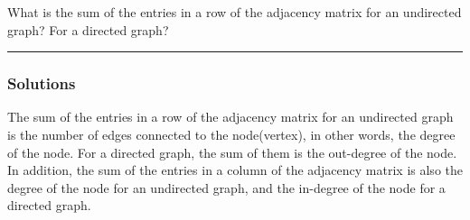 \newpage
\begin{question}
What is the sum of the entries in a row of the adjacency matrix for an undirected graph? For a directed graph?
\end{question}

\par\noindent\rule{\textwidth}{0.5pt}

\subsubsection*{Solutions}


The sum of the entries in a row of the adjacency matrix for an undirected graph is the number of edges connected to the node(vertex), in other words, the degree of the node.
For a directed graph, the sum of them is the out-degree of the node.
In addition, the sum of the entries in a column of the adjacency matrix is also the degree of the node for an undirected graph, and the in-degree of the node for a directed graph.
